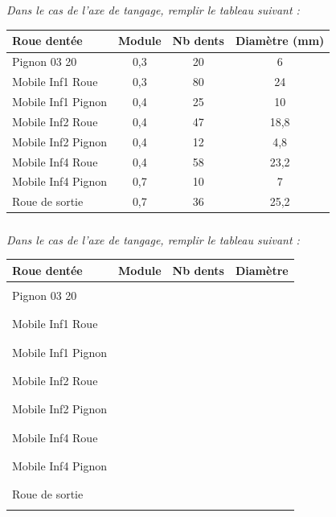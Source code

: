 \documentclass[10pt,fleqn]{article} %
\begin{document}
\begin{multicols}{2}
\ifprof
\subparagraph{}
\textit{Dans le cas de l'axe de tangage, remplir le tableau suivant :}
\begin{corrige}
\begin{center}
\begin{tabular}{|l|c|c|c|}
\hline
Roue dentée & Module & Nb dents & Diamètre (mm)\\
\hline
Pignon 03 20 & 0,3 &20        & 6		\\ \hline
Mobile Inf1 Roue & 0,3 & 80  & 24 	\\ \hline 
Mobile Inf1 Pignon & 0,4 & 25 & 10	\\ \hline
Mobile Inf2 Roue & 0,4 & 47   & 18,8	\\ \hline
Mobile Inf2 Pignon & 0,4 & 12 & 4,8	\\ \hline
Mobile Inf4 Roue & 0,4 & 58   & 23,2	\\ \hline
Mobile Inf4 Pignon & 0,7 & 10 & 7	\\ \hline
Roue de sortie & 0,7 & 36      & 25,2 \\ \hline
\end{tabular}
\end{center}
\end{corrige}

\else
\subparagraph{}
\textit{Dans le cas de l'axe de tangage, remplir le tableau suivant :}
\begin{center}
\begin{tabular}{|l|c|c|c|}
\hline
Roue dentée & Module & Nb dents & Diamètre \\
\hline
& && \\ 
Pignon 03 20 & && \\ 
&& & \\ \hline
&& & \\ 
Mobile Inf1 Roue & && \\ 
&& & \\ \hline
&& & \\ 
Mobile Inf1 Pignon & && \\ 
&& & \\ \hline
&& & \\ 
Mobile Inf2 Roue & && \\ 
&& & \\ \hline
&& & \\ 
Mobile Inf2 Pignon & && \\ 
&& & \\ \hline
&& & \\ 
Mobile Inf4 Roue & && \\ 
&& & \\ \hline
&& & \\ 
Mobile Inf4 Pignon & && \\ 
&& & \\ \hline
&& & \\ 
Roue de sortie & && \\
&& & \\ 
\hline
\end{tabular}
\end{center}
\fi



\end{multicols}
\end{document}
